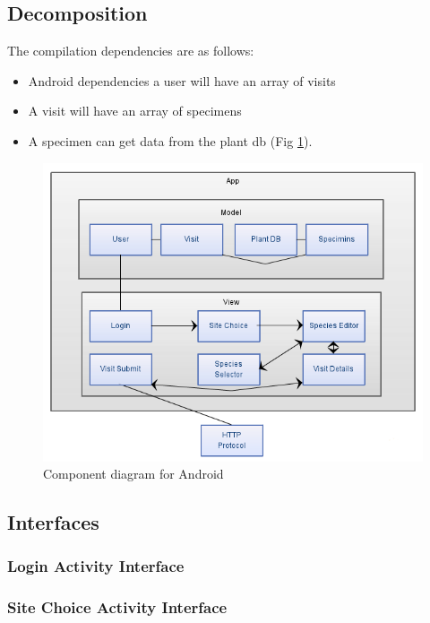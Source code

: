 \subsection{Decomposition}
	The compilation dependencies are as follows:
	\begin{itemize}
		\item Android dependencies a user will have an array of visits
		\item A visit will have an array of specimens
		\item A specimen can get data from the plant db (Fig \ref{fig:androidComponentDiagram}).
	\end{itemize}
	
	\begin{figure}
		\centering
			\includegraphics[scale=0.75]{android/componentDiagram.png}
		\caption{Component diagram for Android}
		\label{fig:androidComponentDiagram}
	\end{figure}

\newpage
\subsection{Interfaces}
	\subsubsection{Login Activity Interface}
		

	\newpage
	\subsubsection{Site Choice Activity Interface}
		


